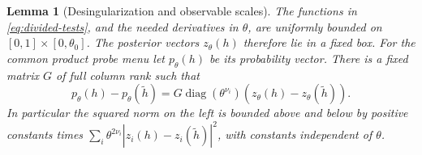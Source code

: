 \documentclass[11pt]{amsart}
\newtheorem{lemma}[theorem]{Lemma}
\theoremstyle{definition}\newtheorem{definition}[theorem]{Definition}
\theoremstyle{remark}\newtheorem{remark}[theorem]{Remark}
\begin{document}
\begin{lemma}[Desingularization and observable scales]\label{lem:observable-scales}
The functions in \eqref{eq:divided-tests}, and the needed derivatives in
$\theta$, are uniformly bounded on $[0,1]\times[0,\theta_0]$.
The posterior vectors $z_\theta(h)$ therefore lie in a fixed box.
For the common product probe menu let $p_\theta(h)$ be its probability
vector. There is a fixed matrix $G$ of full column rank such that
\begin{equation}\label{eq:physical-metric}
 p_\theta(h)-p_\theta(\widetilde h)
    =G\operatorname{diag}(\theta^{\nu_i})
          (z_\theta(h)-z_\theta(\widetilde h)).
\end{equation}
In particular the squared norm on the left is bounded above and below
by positive constants times
$\sum_i\theta^{2\nu_i}|z_i(h)-z_i(\widetilde h)|^2$,
with constants independent of $\theta$.
\end{lemma}
\end{document}
